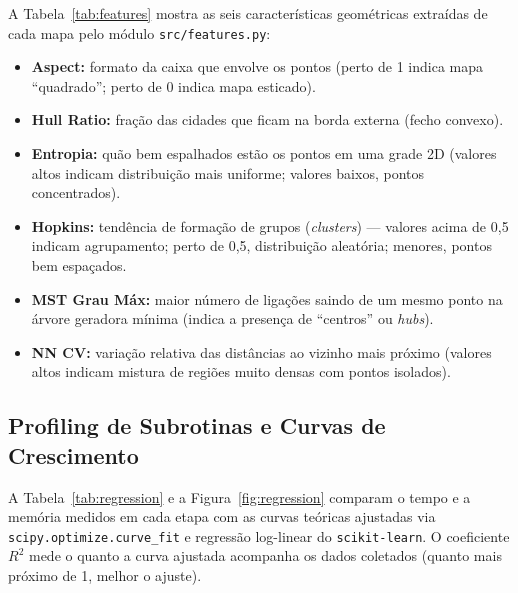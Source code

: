 \documentclass[12pt]{article}
\begin{document}
A Tabela~\ref{tab:features} mostra as seis características geométricas extraídas de cada mapa pelo módulo \texttt{src/features.py}:
\begin{itemize}
  \item \textbf{Aspect:} formato da caixa que envolve os pontos (perto de 1 indica mapa ``quadrado''; perto de 0 indica mapa esticado).
  \item \textbf{Hull Ratio:} fração das cidades que ficam na borda externa (fecho convexo).
  \item \textbf{Entropia:} quão bem espalhados estão os pontos em uma grade 2D (valores altos indicam distribuição mais uniforme; valores baixos, pontos concentrados).
  \item \textbf{Hopkins:} tendência de formação de grupos (\textit{clusters}) — valores acima de 0,5 indicam agrupamento; perto de 0,5, distribuição aleatória; menores, pontos bem espaçados.
  \item \textbf{MST Grau Máx:} maior número de ligações saindo de um mesmo ponto na árvore geradora mínima (indica a presença de ``centros'' ou \textit{hubs}).
  \item \textbf{NN CV:} variação relativa das distâncias ao vizinho mais próximo (valores altos indicam mistura de regiões muito densas com pontos isolados).
\end{itemize}

\begin{table}[htb]
\centering
\caption{Características geométricas e topológicas extraídas das 16 instâncias TSPLIB.}
\label{tab:features}
\footnotesize

\end{table}

\subsection{Profiling de Subrotinas e Curvas de Crescimento}

A Tabela~\ref{tab:regression} e a Figura~\ref{fig:regression} comparam o tempo e a memória medidos em cada etapa com as curvas teóricas ajustadas via \texttt{scipy.optimize.curve\_fit} e regressão log-linear do \texttt{scikit-learn}. O coeficiente $R^2$ mede o quanto a curva ajustada acompanha os dados coletados (quanto mais próximo de 1, melhor o ajuste).
\end{document}
